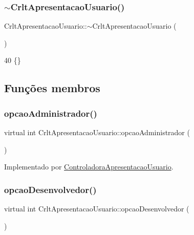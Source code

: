 \subsubsection{\texorpdfstring{$\sim$\+Crlt\+Apresentacao\+Usuario()}{~CrltApresentacaoUsuario()}}
{\footnotesize\ttfamily Crlt\+Apresentacao\+Usuario\+::$\sim$\+Crlt\+Apresentacao\+Usuario (\begin{DoxyParamCaption}{ }\end{DoxyParamCaption})\hspace{0.3cm}{\ttfamily [inline]}}


\begin{DoxyCode}
40 \{\}
\end{DoxyCode}


\subsection{Funções membros}
\mbox{\label{class_crlt_apresentacao_usuario_aa4e0600a397ea82224441793424d7daa}} 
\subsubsection{\texorpdfstring{opcao\+Administrador()}{opcaoAdministrador()}}
{\footnotesize\ttfamily virtual int Crlt\+Apresentacao\+Usuario\+::opcao\+Administrador (\begin{DoxyParamCaption}{ }\end{DoxyParamCaption})\hspace{0.3cm}{\ttfamily [pure virtual]}}



Implementado por \mbox{\hyperlink{class_controladora_apresentacao_usuario_ae4d0223e4aabe11b58039c84c80503c9}{Controladora\+Apresentacao\+Usuario}}.

\mbox{\label{class_crlt_apresentacao_usuario_ad9091cb4093bdc687c0deffb5b00512c}} 
\subsubsection{\texorpdfstring{opcao\+Desenvolvedor()}{opcaoDesenvolvedor()}}
{\footnotesize\ttfamily virtual int Crlt\+Apresentacao\+Usuario\+::opcao\+Desenvolvedor (\begin{DoxyParamCaption}{ }\end{DoxyParamCaption})\hspace{0.3cm}{\ttfamily [pure virtual]}}



